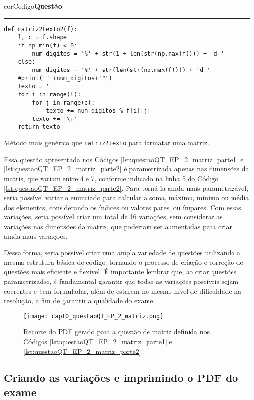 \begin{listing}[!ht]
\begin{myboxCode}{corCodigo}{\textbf{Questão: } }\vspace{3mm}
\hrule
\begin{verbatim}
def matriz2texto2(f):
    l, c = f.shape
    if np.min(f) < 0:
        num_digitos = '%' + str(1 + len(str(np.max(f)))) + 'd '
    else:
        num_digitos = '%' + str(len(str(np.max(f)))) + 'd '
    #print('"'+num_digitos+'"')
    texto = ''
    for i in range(l):
        for j in range(c):
            texto += num_digitos % f[i][j]
        texto += '\n'
    return texto
\end{verbatim}
\end{myboxCode}
\caption{Método mais genérico que \texttt{matriz2texto} para formatar uma matriz.}
\label{lst:matriz2texto2}
\end{listing}
    

Essa questão apresentada nos Códigos \ref{lst:questaoQT_EP_2_matriz_parte1} e \ref{lst:questaoQT_EP_2_matriz_parte2} é parametrizada apenas nas dimensões da matriz, que variam entre 4 e 7, conforme indicado na linha 5 do Código \ref{lst:questaoQT_EP_2_matriz_parte2}. Para torná-la ainda mais parametrizável, seria possível variar o enunciado para calcular a soma, máximo, mínimo ou média dos elementos, considerando os índices ou valores pares, ou ímpares. Com essas variações, seria possível criar um total de 16 variações, sem considerar as variações nas dimensões da matriz, que poderiam ser aumentadas para criar ainda mais variações.


Dessa forma, seria possível criar uma ampla variedade de questões utilizando a mesma estrutura básica de código, tornando o processo de criação e correção de questões mais eficiente e flexível. É importante lembrar que, ao criar questões parametrizadas, é fundamental garantir que todas as variações possíveis sejam coerentes e bem formuladas, além de estarem no mesmo nível de dificuldade na resolução, a fim de garantir a qualidade do exame.

\begin{figure}[!ht]
  \texttt{[image: cap10\_questaoQT\_EP\_2\_matriz.png]}
  \caption{Recorte do PDF gerado para a questão de matriz definida nos Códigos \ref{lst:questaoQT_EP_2_matriz_parte1} e \ref{lst:questaoQT_EP_2_matriz_parte2}.}
  \label{fig:cap10_questaoQT_EP_2_matriz}
\end{figure}

\subsection{Criando as variações e imprimindo o PDF do exame}

